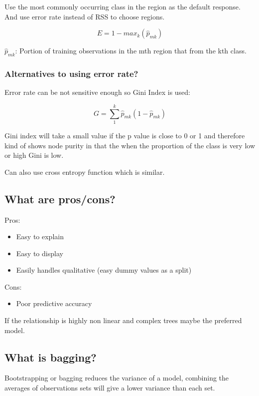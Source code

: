 \documentclass[11pt]{scrartcl} %
\begin{document}
Use the most commonly occurring class in the region as the default response. And use error rate
instead of RSS to choose regions.

\begin{equation}
	E = 1-max_k(\hat{p}_{mk})
\end{equation}

\(\hat{p}_{mk}\): Portion of training observations in the mth region that from the kth class.

\subsubsection{Alternatives to using error rate?}

Error rate can be not sensitive enough so Gini Index is used:

\begin{equation}
	G = \sum^k_1{\hat{p}_{mk}(1-\hat{p}_{mk})}
\end{equation}

Gini index will take a small value if the p value is close to 0 or 1 and therefore kind of shows
node purity in that the when the proportion of the class is very low or high Gini is low.

Can also use cross entropy function which is similar.

\subsection{What are pros/cons?}

Pros:
\begin{itemize}
	\item Easy to explain
	\item Easy to display
	\item Easily handles qualitative (easy dummy values as a split)
\end{itemize}

Cons:
\begin{itemize}
	\item Poor predictive accuracy
\end{itemize}

If the relationship is highly non linear and complex trees maybe the preferred model.

\subsection{What is bagging?}

Bootstrapping or bagging reduces the variance of a model, combining the averages of observations sets
will give a lower variance than each set.
\end{document}
